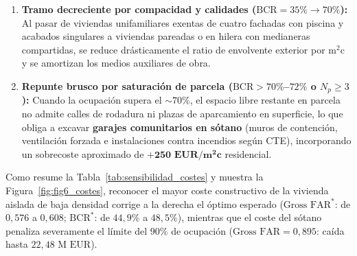 \begin{enumerate}
  \item \textbf{Tramo decreciente por compacidad y calidades ($\text{BCR} = 35\% \to 70\%$):} Al pasar de viviendas unifamiliares exentas de cuatro fachadas con piscina y acabados singulares a viviendas pareadas o en hilera con medianeras compartidas, se reduce drásticamente el ratio de envolvente exterior por $\text{m}^2\text{c}$ y se amortizan los medios auxiliares de obra.
  \item \textbf{Repunte brusco por saturación de parcela ($\text{BCR} > 70\%$--$72\%$ o $N_p \ge 3$):} Cuando la ocupación supera el $\sim 70\%$, el espacio libre restante en parcela no admite calles de rodadura ni plazas de aparcamiento en superficie, lo que obliga a excavar \textbf{garajes comunitarios en sótano} (muros de contención, ventilación forzada e instalaciones contra incendios según CTE), incorporando un sobrecoste aproximado de $\mathbf{+250\text{ EUR}/\text{m}^2\text{c}}$ residencial.
\end{enumerate}

Como resume la Tabla~\ref{tab:sensibilidad_costes} y muestra la Figura~\ref{fig:fig6_costes}, reconocer el mayor coste constructivo de la vivienda aislada de baja densidad corrige a la derecha el óptimo esperado ($\text{Gross FAR}^*$: de $0,576$ a $0,608$; $\text{BCR}^*$: de $44,9\%$ a $48,5\%$), mientras que el coste del sótano penaliza severamente el límite del $90\%$ de ocupación ($\text{Gross FAR} = 0,895$: caída hasta $22,48\text{ M EUR}$).

\begin{table}[htbp]
  \centering
  \caption{Sensibilidad del margen neto esperado $\mathbb{E}[\Pi]$ ante hipótesis de coste constructivo.}
  \label{tab:sensibilidad_costes}
\end{table}

